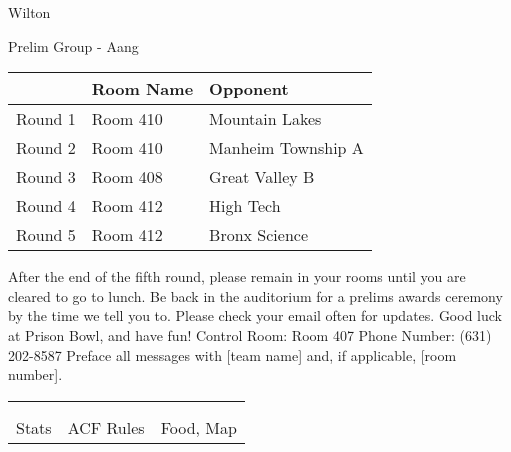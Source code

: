 \documentclass{article}%
\begin{document}
\newpage%
%
\begin{center}%
\begin{Huge}%
Wilton%
\end{Huge}%
\vspace*{12pt}%
\linebreak%
\begin{Large}%
Prelim Group {-} Aang%
\end{Large}%
\end{center}%
\vspace*{4pt}%
\begin{tabularx}{\textwidth}{|c|Y|Y|}%
\hline%
&Room Name&Opponent\\%
\hline%
Round 1&Room 410&Mountain Lakes\\%
Round 2&Room 410&Manheim Township A\\%
Round 3&Room 408&Great Valley B\\%
Round 4&Room 412&High Tech\\%
Round 5&Room 412&Bronx Science\\%
\hline%
\end{tabularx}%
\vspace*{30pt}%
\linebreak%
After the end of the fifth round, please remain in your rooms until you are cleared to go to lunch. Be back in the auditorium for a prelims awards ceremony by the time we tell you to. Please check your email often for updates. Good luck at Prison Bowl, and have fun!\newline%
\newline%
Control Room: Room 407\newline%
Phone Number: (631) 202{-}8587\newline%
Preface all messages with {[}team name{]} and, if applicable, {[}room number{]}.%
\vspace*{30pt}%
\newline%
%
\begin{tabularx}{\textwidth}{YYY}%
  &  &  \\%
\\%
Stats&ACF Rules&Food, Map\\%
\end{tabularx}%
\newpage%
\end{document}
